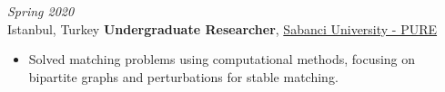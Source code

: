 \vspace{\betweenentryspace}

\begin{twocolentry}{
    \textit{Spring 2020}\\
    \small Istanbul, Turkey}
    \normalsize \textbf{Undergraduate Researcher}, \small \href{https://pure.sabanciuniv.edu/project/4041/solving-matching-problems-using-artificial-intelligence-interview-scheduling}{Sabanci University - PURE}

    \small  
    \begin{itemize}
        \item Solved matching problems using computational methods, focusing on bipartite graphs and perturbations for stable matching.
    \end{itemize}
\end{twocolentry}